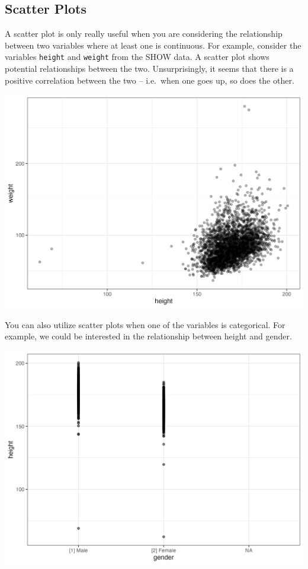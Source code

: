 \documentclass[]{book}
\theoremstyle{definition}
\theoremstyle{definition}
\theoremstyle{definition}
\theoremstyle{remark}
\begin{document}
\hypertarget{scatter-plots}{%
\subsection{Scatter Plots}\label{scatter-plots}}

A scatter plot is only really useful when you are considering the relationship between two variables where at least one is continuous. For example, consider the variables \texttt{height} and \texttt{weight} from the SHOW data. A scatter plot shows potential relationships between the two. Unsurprisingly, it seems that there is a positive correlation between the two -- i.e.~when one goes up, so does the other.

\includegraphics[width=27.08in]{figures/scatter_height_weight}

You can also utilize scatter plots when one of the variables is categorical. For example, we could be interested in the relationship between height and gender.

\includegraphics[width=27.08in]{figures/scatter_gender_height}
\end{document}
